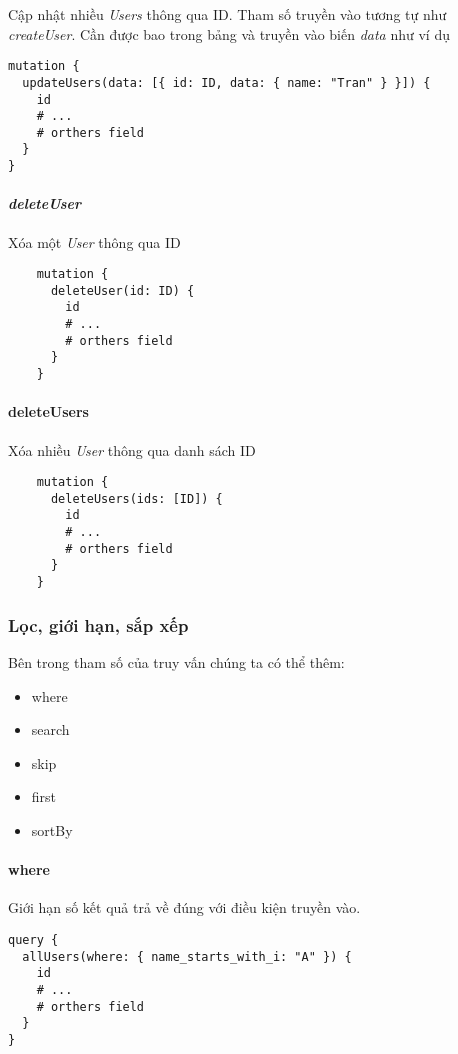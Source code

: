 Cập nhật nhiều \emph{Users} thông qua ID. Tham số truyền vào tương tự như \emph{createUser}. Cần được bao trong bảng và truyền vào biến \emph{data} như ví dụ

\begin{lstlisting}
mutation {
  updateUsers(data: [{ id: ID, data: { name: "Tran" } }]) {
    id
    # ...
    # orthers field
  }
}
\end{lstlisting}

\paragraph{\emph{deleteUser}}

Xóa một \emph{User} thông qua ID

\begin{lstlisting}
	mutation {
	  deleteUser(id: ID) {
	    id
	    # ...
	    # orthers field
	  }
	}
\end{lstlisting}

\paragraph{deleteUsers}

Xóa nhiều \emph{User} thông qua danh sách ID

\begin{lstlisting}
	mutation {
	  deleteUsers(ids: [ID]) {
	    id
	    # ...
	    # orthers field
	  }
	}
\end{lstlisting}

\subsubsection {Lọc, giới hạn, sắp xếp}

Bên trong tham số của truy vấn chúng ta có thể thêm:
\begin{itemize}
	\item {where}
	\item {search}
	\item {skip}
	\item {first}
	\item {sortBy}
\end{itemize}
\paragraph{where}

Giới hạn số kết quả trả về đúng với điều kiện truyền vào.

\begin{lstlisting}
query {
  allUsers(where: { name_starts_with_i: "A" }) {
    id
    # ...
    # orthers field
  }
}
\end{lstlisting}


